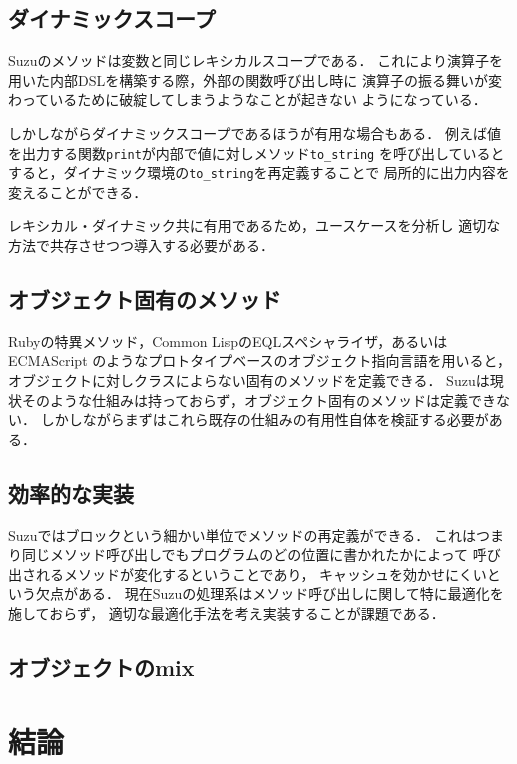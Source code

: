 \documentclass[a4paper,11pt,dvipdfmx]{jreport}
\begin{document}
\section{ダイナミックスコープ}

Suzuのメソッドは変数と同じレキシカルスコープである．
これにより演算子を用いた内部DSLを構築する際，外部の関数呼び出し時に
演算子の振る舞いが変わっているために破綻してしまうようなことが起きない
ようになっている．

しかしながらダイナミックスコープであるほうが有用な場合もある．
例えば値を出力する関数\verb|print|が内部で値に対しメソッド\verb|to_string|
を呼び出しているとすると，ダイナミック環境の\verb|to_string|を再定義することで
局所的に出力内容を変えることができる．

レキシカル・ダイナミック共に有用であるため，ユースケースを分析し
適切な方法で共存させつつ導入する必要がある．

\section{オブジェクト固有のメソッド}

Rubyの特異メソッド，Common LispのEQLスペシャライザ，あるいはECMAScript
\cite{ECMAScript}のようなプロトタイプベースのオブジェクト指向言語を用いると，
オブジェクトに対しクラスによらない固有のメソッドを定義できる．
Suzuは現状そのような仕組みは持っておらず，オブジェクト固有のメソッドは定義できない．
しかしながらまずはこれら既存の仕組みの有用性自体を検証する必要がある．

\section{効率的な実装}

Suzuではブロックという細かい単位でメソッドの再定義ができる．
これはつまり同じメソッド呼び出しでもプログラムのどの位置に書かれたかによって
呼び出されるメソッドが変化するということであり，
キャッシュを効かせにくいという欠点がある．
現在Suzuの処理系はメソッド呼び出しに関して特に最適化を施しておらず，
適切な最適化手法を考え実装することが課題である．

\section{オブジェクトのmix}

\chapter{結論}
\label{chapter:conclusion}
\end{document}
